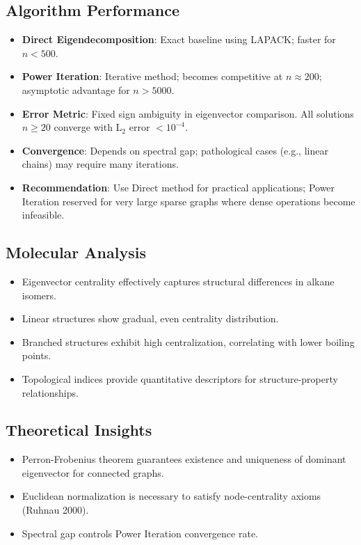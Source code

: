 \documentclass[12pt]{article}
\begin{document}
\subsection{Algorithm Performance}

\begin{itemize}
    \item \textbf{Direct Eigendecomposition}: Exact baseline using LAPACK; faster for $n < 500$.
    \item \textbf{Power Iteration}: Iterative method; becomes competitive at $n \approx 200$; asymptotic advantage for $n > 5000$.
    \item \textbf{Error Metric}: Fixed sign ambiguity in eigenvector comparison. All solutions $n \geq 20$ converge with L$_2$ error $< 10^{-4}$.
    \item \textbf{Convergence}: Depends on spectral gap; pathological cases (e.g., linear chains) may require many iterations.
    \item \textbf{Recommendation}: Use Direct method for practical applications; Power Iteration reserved for very large sparse graphs where dense operations become infeasible.
\end{itemize}

\subsection{Molecular Analysis}

\begin{itemize}
    \item Eigenvector centrality effectively captures structural differences in alkane isomers.
    \item Linear structures show gradual, even centrality distribution.
    \item Branched structures exhibit high centralization, correlating with lower boiling points.
    \item Topological indices provide quantitative descriptors for structure-property relationships.
\end{itemize}

\subsection{Theoretical Insights}

\begin{itemize}
    \item Perron-Frobenius theorem guarantees existence and uniqueness of dominant eigenvector for connected graphs.
    \item Euclidean normalization is necessary to satisfy node-centrality axioms (Ruhnau 2000).
    \item Spectral gap controls Power Iteration convergence rate.
\end{itemize}
\end{document}
